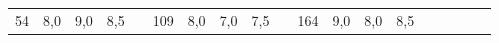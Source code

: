 \begin{table}[H]
{\begin{tabular}{|c|r|r|r|l|c|r|r|r|l|c|r|r|r|lcrrr}
54                                                    & 8,0                                                                       & 9,0                                                                       & 8,5                                                                       &  & 109 & 8,0  & 7,0  & 7,5  &  & 164 & 9,0  & 8,0  & 8,5  &                       & \multicolumn{1}{l}{}     & \multicolumn{1}{l}{}      & \multicolumn{1}{l}{}      & \multicolumn{1}{l}{}      \\ \cline{1-4} \cline{6-9} \cline{11-14}
\end{tabular}%
}
\end{table}
